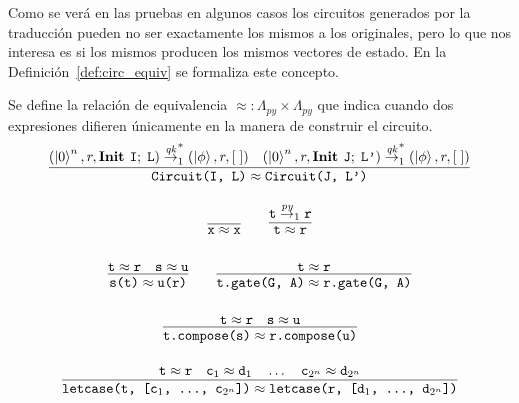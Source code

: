 Como se verá en las pruebas en algunos casos los circuitos generados por la traducción pueden no ser exactamente los mismos a los originales, pero lo que nos interesa es si los mismos producen los mismos vectores de estado. En la Definición~\ref{def:circ_equiv} se formaliza este concepto.


\begin{definicion}
\label{def:circ_equiv}
Se define la relación de equivalencia $\approx: \Lambda_\textit{py} \times \Lambda_\textit{py}$ que indica cuando dos expresiones difieren únicamente en la manera de construir el circuito.
\[\arraycolsep=10pt\def\arraystretch{2.6}
\begin{array}{c}
     \infer
     {\texttt{Circuit(I, L)} \approx \texttt{Circuit(J, L')}}
     {(\ket{0}^n, r, \textbf{Init } \texttt{I};\;\texttt{L}) \redqk_1^* (\ket{\phi}, r, [\;]) \quad (\ket{0}^n, r, \textbf{Init } \texttt{J};\; \texttt{L'}) \redqk_1^* (\ket{\phi}, r, [\;])}
\end{array}
\]
\[\arraycolsep=10pt
\begin{array}{cc}
     \infer
     {\texttt{x}\approx \texttt{x}}
     {}
    &
     \infer
     {\texttt{t} \approx \texttt{r}}
     {\texttt{t} \redpy_1 \texttt{r}}
\end{array}
\]
\[\arraycolsep=10pt\def\arraystretch{2.6}
\begin{array}{cc}
     \infer
     {\texttt{s(t)} \approx \texttt{u(r)}}
     {\texttt{t} \approx \texttt{r} \quad \texttt{s} \approx \texttt{u}}
     &
     \infer
     {\texttt{t.gate(G, A)} \approx \texttt{r.gate(G, A)}}
     {\texttt{t} \approx \texttt{r}}
\end{array}
\]
\[\arraycolsep=10pt\def\arraystretch{2.6}
\begin{array}{c}
     \infer
     {\texttt{t.compose(s)} \approx \texttt{r.compose(u)}}
     {\texttt{t} \approx \texttt{r} \quad \texttt{s} \approx \texttt{u}}
\end{array}
\]
\[\arraycolsep=10pt\def\arraystretch{2.6}
\begin{array}{c}
     \infer
     {\texttt{letcase(t, [c$_1$, \dots, c$_{2^n}$])} \approx \texttt{letcase(r, [d$_1$, \dots, d$_{2^n}$])}}
     {\texttt{t} \approx \texttt{r} \quad \texttt{c}_1 \approx \texttt{d}_1 \quad \dots \quad \texttt{c}_{2^n} \approx \texttt{d}_{2^n}}
\end{array}
\]
\end{definicion}

